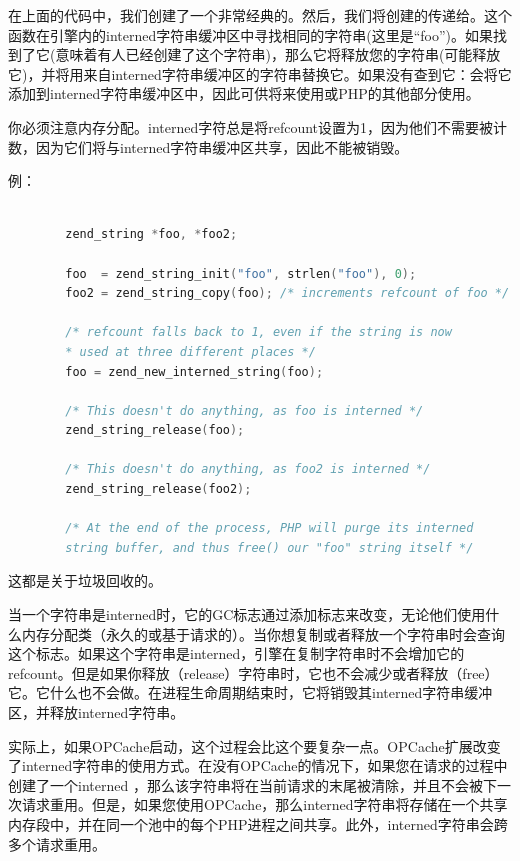在上面的代码中，我们创建了一个非常经典的。然后，我们将创建的传递给。这个函数在引擎内的interned字符串缓冲区中寻找相同的字符串(这里是“foo”)。如果找到了它(意味着有人已经创建了这个字符串)，那么它将释放您的字符串(可能释放它)，并将用来自interned字符串缓冲区的字符串替换它。如果没有查到它：会将它添加到interned字符串缓冲区中，因此可供将来使用或PHP的其他部分使用。

你必须注意内存分配。interned字符总是将refcount设置为1，因为他们不需要被计数，因为它们将与interned字符串缓冲区共享，因此不能被销毁。

例：

\begin{lstlisting}[language=c]

        zend_string *foo, *foo2;

        foo  = zend_string_init("foo", strlen("foo"), 0);
        foo2 = zend_string_copy(foo); /* increments refcount of foo */

        /* refcount falls back to 1, even if the string is now
        * used at three different places */
        foo = zend_new_interned_string(foo);

        /* This doesn't do anything, as foo is interned */
        zend_string_release(foo);

        /* This doesn't do anything, as foo2 is interned */
        zend_string_release(foo2);

        /* At the end of the process, PHP will purge its interned
        string buffer, and thus free() our "foo" string itself */
\end{lstlisting}

这都是关于垃圾回收的。

当一个字符串是interned时，它的GC标志通过添加标志来改变，无论他们使用什么内存分配类（永久的或基于请求的）。当你想复制或者释放一个字符串时会查询这个标志。如果这个字符串是interned，引擎在复制字符串时不会增加它的refcount。但是如果你释放（release）字符串时，它也不会减少或者释放（free）它。它什么也不会做。在进程生命周期结束时，它将销毁其interned字符串缓冲区，并释放interned字符串。

实际上，如果OPCache启动，这个过程会比这个要复杂一点。OPCache扩展改变了interned字符串的使用方式。在没有OPCache的情况下，如果您在请求的过程中创建了一个interned ，那么该字符串将在当前请求的末尾被清除，并且不会被下一次请求重用。但是，如果您使用OPCache，那么interned字符串将存储在一个共享内存段中，并在同一个池中的每个PHP进程之间共享。此外，interned字符串会跨多个请求重用。

